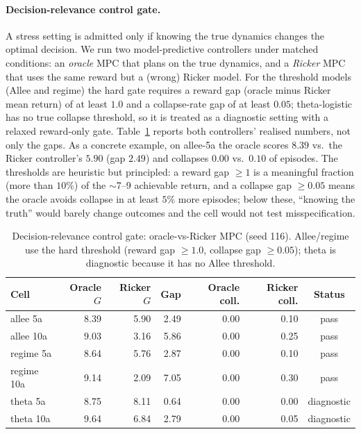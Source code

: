 \documentclass[11pt]{article}
\begin{document}
\paragraph{Decision-relevance control gate.}
\label{sec:gate}
A stress setting is admitted only if knowing the true dynamics changes the optimal
decision. We run two model-predictive controllers under matched conditions: an
\emph{oracle} MPC that plans on the true dynamics, and a \emph{Ricker} MPC that uses the
same reward but a (wrong) Ricker model. For the threshold models (Allee and regime) the
hard gate requires a reward gap (oracle minus Ricker mean return) of at least $1.0$ and a
collapse-rate gap of at least $0.05$; theta-logistic has no true collapse threshold, so it
is treated as a diagnostic setting with a relaxed reward-only gate. Table~\ref{tab:gate}
reports both controllers' realised numbers, not only the gaps. As a concrete example, on
allee-5a the oracle scores $8.39$ vs.\ the Ricker controller's $5.90$ (gap $2.49$) and
collapses $0.00$ vs.\ $0.10$ of episodes. The thresholds are heuristic but principled: a
reward gap $\ge 1$ is a meaningful fraction (more than $10\%$) of the $\sim$7--9 achievable
return, and a collapse gap $\ge 0.05$ means the oracle avoids collapse in at least $5\%$
more episodes; below these, ``knowing the truth'' would barely change outcomes and the
cell would not test misspecification.

\begin{table}[h]
\centering\small
\caption{Decision-relevance control gate: oracle-vs-Ricker MPC (seed 116). Allee/regime
use the hard threshold (reward gap $\ge 1.0$, collapse gap $\ge 0.05$); theta is
diagnostic because it has no Allee threshold.}
\label{tab:gate}
\begin{tabular}{@{}lrrrrrc@{}}
\toprule
Cell & Oracle $G$ & Ricker $G$ & Gap & Oracle coll. & Ricker coll. & Status \\
\midrule
allee 5a   & 8.39 & 5.90 & 2.49 & 0.00 & 0.10 & pass \\
allee 10a  & 9.03 & 3.16 & 5.86 & 0.00 & 0.25 & pass \\
regime 5a  & 8.64 & 5.76 & 2.87 & 0.00 & 0.10 & pass \\
regime 10a & 9.14 & 2.09 & 7.05 & 0.00 & 0.30 & pass \\
theta 5a   & 8.75 & 8.11 & 0.64 & 0.00 & 0.00 & diagnostic \\
theta 10a  & 9.64 & 6.84 & 2.79 & 0.00 & 0.05 & diagnostic \\
\bottomrule
\end{tabular}
\end{table}
\end{document}
